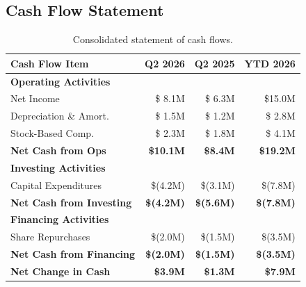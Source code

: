 \documentclass[
    language=english,
    doctype=quarterly-report,
    institution=none,
]{../../omnilatex}
\begin{document}
\subsection{Cash Flow Statement}

\begin{table}[h]
    \centering
    \begin{tabular}{lrrr}
        \toprule
        \textbf{Cash Flow Item} & \textbf{Q2 2026} & \textbf{Q2 2025} & \textbf{YTD 2026} \\
        \midrule
        \textbf{Operating Activities} & & & \\
        \quad Net Income               & \$ 8.1M & \$ 6.3M & \$15.0M \\
        \quad Depreciation \& Amort.   & \$ 1.5M & \$ 1.2M & \$ 2.8M \\
        \quad Stock-Based Comp.        & \$ 2.3M & \$ 1.8M & \$ 4.1M \\
        \midrule
        \textbf{Net Cash from Ops}     & \textbf{\$10.1M} & \textbf{\$8.4M} & \textbf{\$19.2M} \\
        \midrule
        \textbf{Investing Activities} & & & \\
        \quad Capital Expenditures     & \$(4.2M) & \$(3.1M) & \$(7.8M) \\
        \midrule
        \textbf{Net Cash from Investing} & \textbf{\$(4.2M)} & \textbf{\$(5.6M)} & \textbf{\$(7.8M)} \\
        \midrule
        \textbf{Financing Activities} & & & \\
        \quad Share Repurchases        & \$(2.0M) & \$(1.5M) & \$(3.5M) \\
        \midrule
        \textbf{Net Cash from Financing} & \textbf{\$(2.0M)} & \textbf{\$(1.5M)} & \textbf{\$(3.5M)} \\
        \midrule
        \textbf{Net Change in Cash}   & \textbf{\$3.9M} & \textbf{\$1.3M} & \textbf{\$7.9M} \\
        \bottomrule
    \end{tabular}
    \caption{Consolidated statement of cash flows.}
\end{table}

\printbibliography[heading=none]
\end{document}
